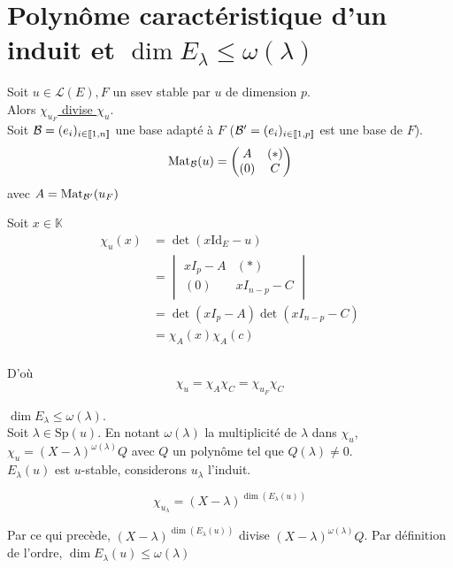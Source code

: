 \documentclass[]{article}
\begin{document}
\section{Polynôme caractéristique d'un induit et $\dim E_\lambda \leq \omega(\lambda)$}

Soit $u \in \mathcal{L}(E), F$ un ssev stable par $u$ de dimension $p$. \\

Alors \underline{$\chi_{u_F}$ divise $\chi_u$}. \\

Soit $\mathcal{B} = (e_i)_{i \in \llbracket {1}, {n} \rrbracket}$ une base adapté à $F$ ($\mathcal{B}' = (e_i)_{i \in \llbracket {1}, {p} \rrbracket}$ est une base de $F$). \\

\[ \text{Mat}_{\mathcal{B}}(u) = \begin{pmatrix}
    A & (*) \\
    (0) & C
\end{pmatrix} \]
avec $A = \text{Mat}_{\mathcal{B}'}(u_F)$

Soit $x \in \mathbb{K}$
\begin{align*}
    \chi_u(x) &= \det(x \text{Id}_E - u) \\
    &= \begin{vmatrix}
        xI_{p} - A & (*) \\
        (0) & xI_{n - p} - C
    \end{vmatrix} \\
    &= \det (x I_p - A) \det(xI_{n-p} - C) \\
    &= \chi_A(x) \chi_A(c) \\
\end{align*} 

D'où
\[ \chi_u = \chi_A \chi_C = \chi_{u_F} \chi_C  \]

\underline{$\dim E_\lambda \leq \omega(\lambda)$}.  \\

Soit $\lambda \in \text{Sp}(u)$. En notant $\omega(\lambda)$ la multiplicité de $\lambda$ dans $\chi_u$, $\chi_u = (X - \lambda)^{\omega(\lambda)}Q$ avec $Q$ un polynôme tel que $Q(\lambda) \neq 0$. \\

$E_{\lambda}(u)$ est $u$-stable, considerons $u_{\lambda}$ l'induit.

\[ \chi_{u_{\lambda}} = (X - \lambda)^{\dim(E_{\lambda}(u))} \]

Par ce qui precède, $ (X - \lambda)^{\dim(E_{\lambda}(u))} $ divise $(X - \lambda)^{\omega(\lambda)}Q$. Par définition de l'ordre, $\dim E_{\lambda}(u) \leq \omega(\lambda)$
\end{document}
